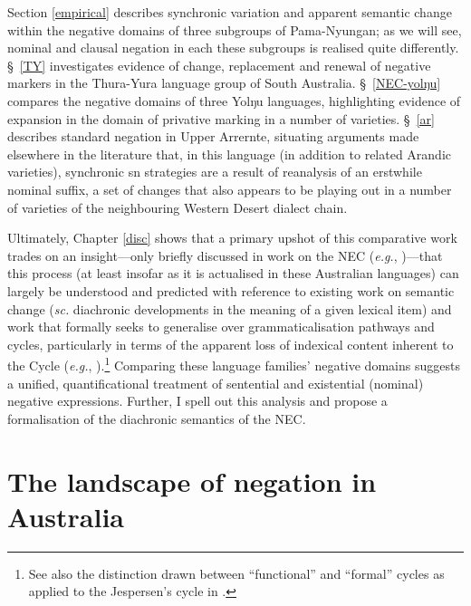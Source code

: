  Section \ref{empirical} describes synchronic variation and apparent semantic change within the negative domains of three subgroups of Pama-Nyungan; as we will see, nominal and clausal negation in each these subgroups is realised quite differently. \S~\ref{TY} investigates evidence of change, replacement and renewal of negative markers in the Thura-Yura language group of South Australia. \S~\ref{NEC-yolŋu} compares the negative domains of three Yolŋu languages, highlighting evidence of expansion in the domain of privative marking in a number of varieties. \S~\ref{ar} describes standard negation in Upper Arrernte, situating arguments made elsewhere in the literature \citep[particularly][]{Henderson2013} that, in this language (in addition to related Arandic varieties), synchronic \acrshort{sn} strategies are a result of reanalysis of an erstwhile nominal suffix, a set of changes that also appears to be playing out in a number of varieties of the neighbouring Western Desert dialect chain.

Ultimately, Chapter \ref{disc} shows that a primary upshot of this comparative work trades on an insight---only briefly discussed in work on the \acrshort{NEC} (\textit{e.g.}, \citealt[17]{Croft1991})---that this process (at least insofar as it is actualised in these Australian languages) can largely be understood and predicted with reference to existing work on semantic change (\textit{sc.} diachronic developments in the meaning of a given lexical item) and work that formally seeks to generalise over grammaticalisation pathways and cycles, particularly in terms of the apparent loss of indexical content inherent to the Cycle (\textit{e.g.}, \citealt{Deo2015,Deo2015a,Deo2017a}).\footnote{See also the distinction drawn between ``functional'' and ``formal'' cycles as applied to the Jespersen's cycle in \citet{Ahern}.}  Comparing these language families' negative domains suggests a unified, quantificational treatment of sentential and existential (nominal) negative expressions. Further, I spell out this analysis and propose a formalisation of the diachronic semantics of the \acrshort{NEC}.

\chapter{The landscape of negation in Australia}\label{NEC1}

